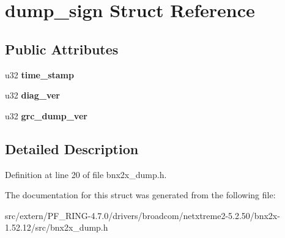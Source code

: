 \hypertarget{structdump__sign}{
\section{dump\_\-sign Struct Reference}
\label{structdump__sign}
}
\subsection*{Public Attributes}
\begin{DoxyCompactItemize}
\item 
\hypertarget{structdump__sign_a1baaff844457c2e64ba2290d89fc3f1a}{
u32 {\bfseries time\_\-stamp}}
\label{structdump__sign_a1baaff844457c2e64ba2290d89fc3f1a}

\item 
\hypertarget{structdump__sign_ac722c92d98361eeb7cab55b91a9fb1d0}{
u32 {\bfseries diag\_\-ver}}
\label{structdump__sign_ac722c92d98361eeb7cab55b91a9fb1d0}

\item 
\hypertarget{structdump__sign_a689bcaf5ce80f854e1e7e552fc716dc4}{
u32 {\bfseries grc\_\-dump\_\-ver}}
\label{structdump__sign_a689bcaf5ce80f854e1e7e552fc716dc4}

\end{DoxyCompactItemize}


\subsection{Detailed Description}


Definition at line 20 of file bnx2x\_\-dump.h.



The documentation for this struct was generated from the following file:\begin{DoxyCompactItemize}
\item 
src/extern/PF\_\-RING-\/4.7.0/drivers/broadcom/netxtreme2-\/5.2.50/bnx2x-\/1.52.12/src/bnx2x\_\-dump.h\end{DoxyCompactItemize}
